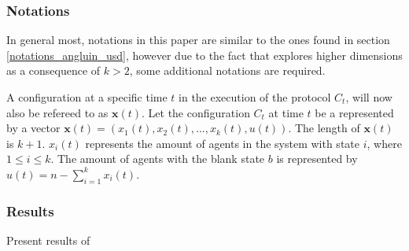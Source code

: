 \subsubsection{Notations}

In general most, notations in this paper are similar to the ones found in section \ref{notations_angluin_usd}, however due to the fact that \cite{AspnesFastConverganceOfKOpinion2023} explores higher dimensions as a consequence of $k > 2$, some additional notations are required. 

A configuration at a specific time $t$ in the execution of the protocol $C_t$, will now also be refereed to as $\textbf{x}(t)$. Let the configuration $C_t$ at time $t$ be a represented by a vector $\textbf{x}(t) = (x_1(t), x_2(t), ..., x_k(t), u(t))$. The length of $\textbf{x}(t)$ is $k + 1$. $x_i(t)$ represents the amount of agents in the system with state $i$, where $1 \leq i \leq k$. The amount of agents with the blank state $b$ is represented by $u(t) = n - \sum_{i=1}^k x_i(t)$. 

\subsubsection{Results}
Present results of \cite{AspnesFastConverganceOfKOpinion2023}

\clearpage